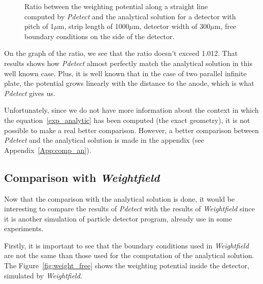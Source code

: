 \documentclass[11pt]{article}
\begin{document}
\begin{figure}[H]
\begin{minipage}[b]{.46\linewidth}
				\caption{Ratio between the weighting potential along a straight line
						computed by \textit{Pdetect} and the analytical solution for a detector with pitch
						of 1$\mu$m, strip length of 1000$\mu$m, detector width of 300$\mu$m, free boundary conditions
						on the side of the detector.}
				\label{fig:parallel_ratio}
			\end{minipage}
		\end{figure}

		On the graph of the ratio, we see that the ratio doesn't exceed 1.012. That results shows how \textit{Pdetect}
		almost perfectly match the analytical solution in this well known case. Plus, it is well known that in the case
		of two parallel infinite plate, the potential grows linearly with the distance to the anode, which is what 
		\textit{Pdetect} gives us.

		Unfortunately, since we do not have more information about the context in which the equation~\ref{exp_analytic}
		has been computed (the exact geometry), it is not possible to make a real better comparison. However,
		a better comparison between \textit{Pdetect} and the analytical solution is made in the appendix (see
		Appendix~\ref{App:comp_an}).

	\subsection{Comparison with \textit{Weightfield}}

		Now that the comparison with the analytical solution is done, it would be interesting to compare the results
		of \textit{Pdetect} with the results of \textit{Weightfield} since it is another simulation of particle detector
		program, already use in some experiments.

		Firstly, it is important to see that the boundary conditions used in \textit{Weightfield} are not the same
		than those used for the computation of the analytical solution. The Figure~\ref{fig:weight_free} shows
		the weighting potential inside the detector, simulated by \textit{Weightfield}.
\end{document}
